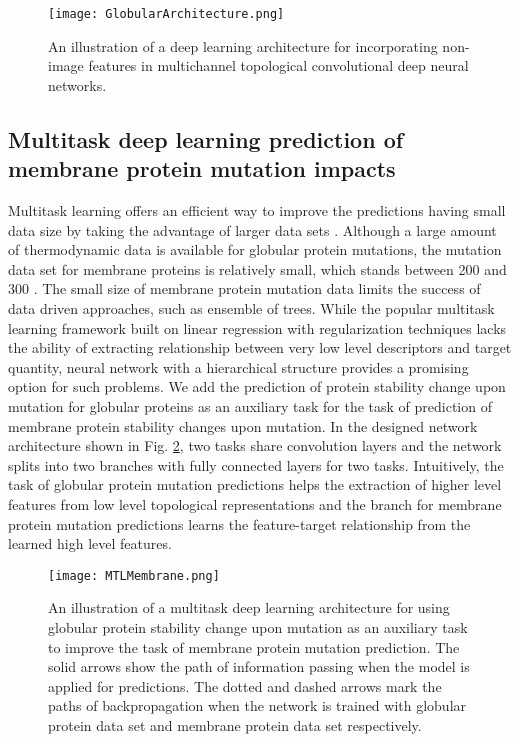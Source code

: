 \documentclass[10pt]{article}
\begin{document}
\begin{figure}[ht]
\begin{center}
\texttt{[image: GlobularArchitecture.png]}
\caption{An illustration of a deep learning architecture for incorporating non-image features in multichannel topological convolutional deep neural networks.}
\label{fig:Multifeature}
\end{center}
\end{figure}

\subsection{Multitask deep learning prediction of membrane protein mutation impacts}


Multitask learning offers an efficient way to improve the predictions having small data size by  taking the advantage of larger data sets 
 \cite{zhou2011malsar}.   Although a large amount of thermodynamic data is available for globular  protein mutations, the mutation data set for membrane proteins is relatively small, which stands between 200 and 300 \cite{Kroncke:2016}. The small size of membrane protein mutation data limits the success of data driven approaches, such as ensemble of trees.  While the popular multitask learning framework built on linear regression with regularization techniques lacks the ability of extracting relationship between very low level descriptors and  target quantity, neural network with a hierarchical structure provides a promising option for such problems. We add the prediction of protein stability change upon mutation for globular proteins as an auxiliary task for the task of prediction of membrane protein stability changes upon mutation. In the designed network architecture shown in Fig. \ref{fig:MTLMembrane},  two tasks share convolution layers and the network splits into two branches with fully connected layers for two tasks. Intuitively, the task of globular protein mutation predictions  helps  the extraction of higher level features from low level topological representations and the branch for membrane protein mutation predictions learns the feature-target relationship from the learned high level features. 
 
 \begin{figure}[ht]
\begin{center}
\texttt{[image: MTLMembrane.png]}
\caption{An illustration of a multitask deep learning architecture for  using globular protein stability change upon mutation as an auxiliary task to improve the task of membrane protein mutation prediction. The solid arrows show the path of information passing when the model is applied for predictions. The dotted and dashed arrows mark the paths of backpropagation when the network is trained with globular protein data set and membrane protein data set respectively.}
\label{fig:MTLMembrane}
\end{center}
\end{figure}
\end{document}
